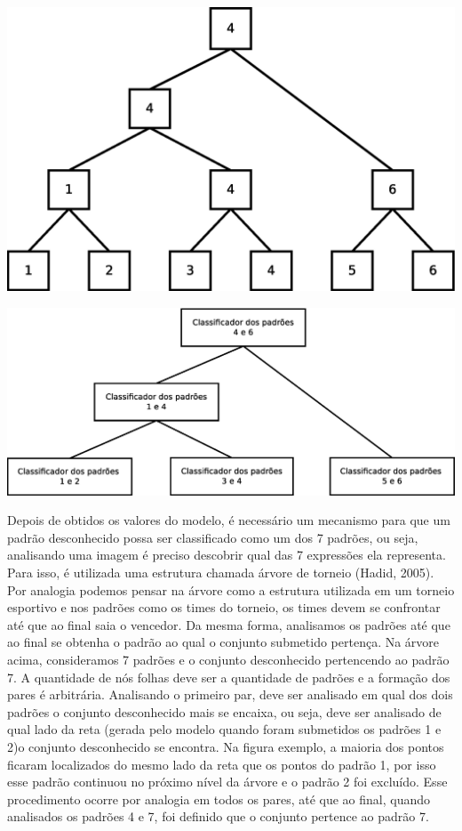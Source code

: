 \begin{center}
	\includegraphics[scale=0.4]{graficos/ArvTorneio1}
	\label{img:ArvTorneio1}
\end{center}

\begin{center}
	\includegraphics[scale=0.4]{graficos/ArvTorneio2}
	\label{img:ArvTorneio2}
\end{center}
Depois de obtidos os valores do modelo, é necessário um mecanismo para que um padrão desconhecido possa ser classificado como um dos 7 padrões, ou seja, analisando uma imagem é preciso descobrir qual das 7 expressões ela representa. Para isso, é utilizada uma estrutura chamada árvore de torneio (Hadid, 2005). Por analogia podemos pensar na árvore como a estrutura utilizada em um torneio esportivo e nos padrões como os times do torneio, os times devem se confrontar até que ao final saia o vencedor. Da mesma forma, analisamos os padrões até que ao final se obtenha o padrão ao qual o conjunto submetido pertença.
Na árvore acima, consideramos 7 padrões e o conjunto desconhecido pertencendo ao padrão 7. A quantidade de nós folhas deve ser a quantidade de padrões e a formação dos pares é arbitrária. Analisando o primeiro par, deve ser analisado em qual dos dois padrões o conjunto desconhecido mais se encaixa, ou seja, deve ser analisado de qual lado da reta (gerada pelo modelo quando foram submetidos os padrões 1 e 2)o conjunto desconhecido se encontra. Na figura exemplo, a maioria dos pontos ficaram localizados do mesmo lado da reta que os pontos do padrão 1, por isso esse padrão continuou no próximo nível da árvore e o padrão 2 foi excluído. Esse procedimento ocorre por analogia em todos os pares, até que ao final, quando analisados os padrões 4 e 7, foi definido que o conjunto pertence ao padrão 7.
